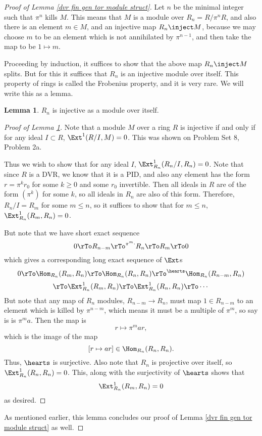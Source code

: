 \documentclass[12 pt]{article}
\theoremstyle{definition}
\newtheorem{lemma}[theorem]{Lemma}
\begin{document}
\begin{proof}[Proof of Lemma \ref{dvr fin gen tor module struct}] Let $n$ be the minimal integer such that $\pi^n$ kills $M$. This means that $M$ is a module over $R_n=R/\pi^nR$, and also there is an element $m \in M$, and an injective map $R_n \inject M$, because we may choose $m$ to be an element which is not annihilated by $\pi^{n-1}$, and then take the map to be $1 \mapsto m$.

Proceeding by induction, it suffices to show that the above map $R_n \inject M$ splits. But for this it suffices that $R_n$ is an injective module over itself. This property of rings is called the Frobenius property, and it is very rare. We will write this as a lemma.
\begin{lemma} $R_n$ is injective as a module over itself.
\label{Rn Frobenius}
\end{lemma}
\begin{proof}[Proof of Lemma \ref{Rn Frobenius}] Note that a module $M$ over a ring $R$ is injective if and only if for any ideal $I \subset R$, $\Ext^1(R/I,M)=0$. This was shown on  Problem Set 8, Problem 2a.

Thus we wish to show that for any ideal $I$, $\Ext^1_{R_n}(R_n/I,R_n)=0$. Note that since $R$ is a DVR, we know that it is a PID, and also any element has the form $r=\pi^kr_0$ for some $k \geq 0$ and some $r_0$ invertible. Then all ideals in $R$ are of the form $(\pi^k)$ for some $k$, so all ideals in $R_n$ are also of this form. Therefore, $R_n/I=R_m$ for some $m \leq n$, so it suffices to show that for $m \leq n$, $\Ext^1_{R_n}(R_m,R_n)=0$.

But note that we have short exact sequence
\[ 0 \rTo R_{n-m} \rTo^{\pi^m \cdot} R_n \rTo R_m \rTo 0\]
which gives a corresponding long exact sequence of $\Ext$s
\[0 \rTo \Hom_{R_n}(R_m,R_n) \rTo \Hom_{R_n}(R_n,R_n) \rTo^\hearts \Hom_{R_n}(R_{n-m},R_n)\]
\[\rTo \Ext^1_{R_n}(R_m,R_n) \rTo \Ext^1_{R_n}(R_n,R_n) \rTo \cdots\]
But note that any map of $R_n$ modules, $R_{n-m} \to R_n$, must map $1 \in R_{n-m}$ to an element which is killed by $\pi^{n-m}$, which means it must be a multiple of $\pi^m$, so say is is $\pi^ma$. Then the map is
\[r \mapsto \pi^mar,\]
which is the image of the map
\[[r \mapsto ar] \in \Hom_{R_n}(R_n,R_n).\]
Thus, $\hearts$ is surjective.
Also note that $R_n$ is projective over itself, so $\Ext^1_{R_n}(R_n,R_n)=0$. This, along with the surjectivity of $\hearts$ shows that
\[\Ext^1_{R_n}(R_m,R_n)=0\]
as desired.
\end{proof}
As mentioned earlier, this lemma concludes our proof of Lemma \ref{dvr fin gen tor module struct} as well.
\end{proof}
\end{document}

